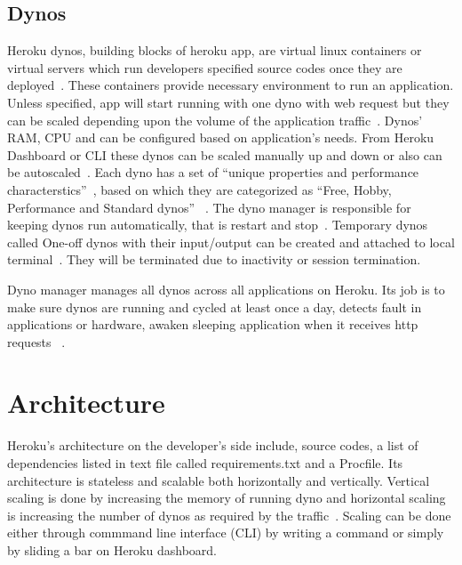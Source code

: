 \subsection{Dynos}
Heroku dynos, building blocks of heroku app, are virtual linux containers or
 virtual servers which run developers specified source codes once they are 
deployed~\cite{www-heroku-dynos}. These containers provide necessary environment
 to run an application.  Unless specified, app will start running with one dyno 
with  web request but they can be scaled depending upon the volume of the 
application traffic~\cite{www-heroku-dynos}. Dynos' RAM, CPU  and  can be 
configured based on application's needs. From Heroku Dashboard or CLI these 
dynos can be scaled manually up and down or also can be 
autoscaled~\cite{www-heroku-dynos}. Each dyno has a set of 
``unique properties and performance characterstics''~\cite{www-heroku-dynos}, 
based on which they are categorized as ``Free, Hobby, Performance and Standard 
dynos''~ \cite{www-devcenter-dynos}. The dyno manager is responsible for keeping
dynos run automatically, that is restart and stop~\cite{www-devcenter-dynos}. 
Temporary dynos called One-off dynos with their input/output can be created 
and attached to local terminal~\cite{www-how-heroku-works}. They will be 
terminated due to inactivity or session termination.

Dyno manager manages all dynos across all applications on Heroku. Its job is 
to make sure dynos are running and cycled at least once a day, detects fault
 in applications or hardware, awaken sleeping application when it receives http
requests ~\cite{www-how-heroku-works}. 



 




\section{Architecture}
Heroku's architecture on the developer's side include, source codes, a list of
 dependencies listed in text file called requirements.txt and a Procfile. Its
 architecture is stateless and scalable both horizontally and vertically.
 Vertical scaling is done by increasing the memory of running dyno and
 horizontal scaling is increasing the number of dynos as required by
 the traffic~\cite{www-python-heroku-com}. Scaling can be done either
 through commmand line interface (CLI) by writing a command or simply
 by sliding a bar on Heroku dashboard. 

